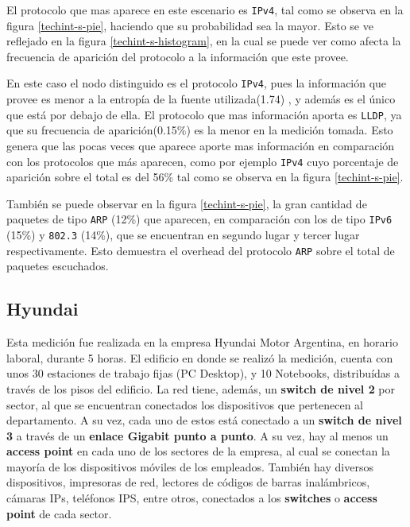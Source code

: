 \documentclass[final,inline,a4paper,narroweqnarray]{ieee}
\begin{document}
    El protocolo que mas aparece en este escenario es \texttt{IPv4},
    tal como se observa en la figura \ref{techint-s-pie}, haciendo que
    su probabilidad sea la mayor. Esto se ve reflejado en la figura
    \ref{techint-s-histogram}, en la cual se puede ver como afecta la
    frecuencia de aparición del protocolo a la información que este
    provee.


    En este caso el nodo distinguido es el protocolo \texttt{IPv4},
    pues la información que provee es menor a la entropía de la fuente
    utilizada(1.74) , y además es el único que está por debajo de
    ella. El protocolo que mas información aporta es \texttt{LLDP}, ya
    que su frecuencia de aparición(0.15\%) es la menor en la medición
    tomada. Esto genera que las pocas veces que aparece aporte mas
    información en comparación con los protocolos que más aparecen,
    como por ejemplo
    \texttt{IPv4} cuyo porcentaje de aparición sobre el total es del 56\%
    tal como se observa en la figura \ref{techint-s-pie}.

    También se puede observar en la figura \ref{techint-s-pie}, la
    gran cantidad de paquetes de tipo \texttt{ARP} (12\%) que
    aparecen, en comparación con los de tipo \texttt{IPv6} (15\%) y
    \texttt{802.3} (14\%), que se encuentran en segundo lugar y tercer
    lugar respectivamente. Esto demuestra el overhead del protocolo
    \texttt{ARP} sobre el total de paquetes escuchados.

  \subsection{Hyundai}

    Esta medición fue realizada en la empresa Hyundai Motor Argentina,
    en horario laboral, durante 5 horas. El edificio en donde se
    realizó la medición, cuenta con unos 30 estaciones de trabajo
    fijas (PC Desktop), y 10 Notebooks, distribuídas a través de los
    pisos del edificio. La red tiene, además, un \textbf{switch de
    nivel 2} por sector, al que se encuentran conectados los
    dispositivos que pertenecen al departamento. A su vez, cada uno de
    estos está conectado a un \textbf{switch de nivel 3} a través de
    un \textbf{enlace Gigabit punto a punto}. A su vez, hay al menos
    un \textbf{access point} en cada uno de los sectores de la
    empresa, al cual se conectan la mayoría de los dispositivos
    móviles de los empleados. También hay diversos dispositivos,
    impresoras de red, lectores de códigos de barras inalámbricos,
    cámaras IPs, teléfonos IPS, entre otros, conectados a los
    \textbf{switches} o \textbf{access point} de cada sector.
\end{document}
